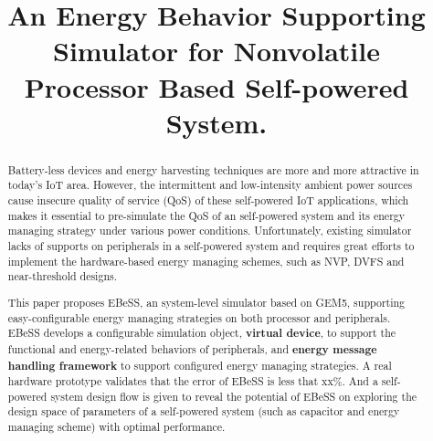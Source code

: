 \documentclass[sigconf]{acmart}
\begin{document}
\title{An Energy Behavior Supporting Simulator for Nonvolatile Processor Based Self-powered System.}

\begin{comment}
\titlenote{Produces the permission block, and
  copyright information}
\subtitle{Extended Abstract}
\subtitlenote{The full version of the author's guide is available as
  \texttt{acmart.pdf} document}
\end{comment}

\begin{comment}
\author{Ben Trovato}
\authornote{Dr.~Trovato insisted his name be first.}
\orcid{1234-5678-9012}
\affiliation{%
  \institution{Institute for Clarity in Documentation}
  \streetaddress{P.O. Box 1212}
  \city{Dublin} 
  \state{Ohio} 
  \postcode{43017-6221}
}
\email{trovato@corporation.com}
\end{comment}


\begin{abstract}
%
Battery-less devices and energy harvesting techniques are more and more attractive in today's IoT area. However, the intermittent and low-intensity ambient power sources cause insecure quality of service (QoS) of these self-powered IoT applications, which makes it essential to pre-simulate the QoS of an self-powered system and its energy managing strategy under various power conditions. Unfortunately, existing simulator lacks of supports on peripherals in a self-powered system and requires great efforts to implement the hardware-based energy managing schemes, such as NVP, DVFS and near-threshold designs. 

This paper proposes EBeSS, an system-level simulator based on GEM5, supporting easy-configurable energy managing strategies on both processor and peripherals. EBeSS develops a configurable simulation object, \textbf{virtual device}, to support the functional and energy-related behaviors of peripherals, and \textbf{energy message handling framework} to support configured energy managing strategies. A real hardware prototype validates that the error of EBeSS is less that xx\%. And a self-powered system design flow is given to reveal the potential of EBeSS on exploring the design space of parameters of a self-powered system (such as capacitor and energy managing scheme) with optimal performance.

\end{abstract}

\maketitle








 
\end{document}
